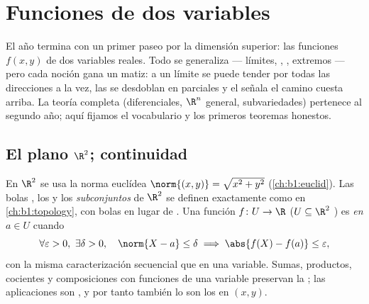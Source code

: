\chapter{Funciones de dos variables}\label{ch:b1:multivar}

El año termina con un primer paseo por la dimensión superior: las funciones
$f(x, y)$ de dos variables reales. Todo se generaliza --- límites,
, , extremos --- pero cada noción gana un matiz:
a un límite se puede tender por todas las direcciones a la vez, las 
se desdoblan en parciales y el  señala el camino cuesta arriba. La
teoría completa (diferenciales, $\R^n$ general, subvariedades) pertenece al
segundo año; aquí fijamos el vocabulario y los primeros teoremas
honestos.

\section{El plano $\R^2$; continuidad}

\begin{definition}\label{def:b1:multivar:topology}
En $\R^2$ se usa la norma euclídea $\norm{(x,y)} = \sqrt{x^2 + y^2}$
(\cref{ch:b1:euclid}). Las bolas , los  y los \emph{subconjuntos
} de $\R^2$ se definen exactamente como en
\cref{ch:b1:topology}, con bolas en lugar de . Una función
$f \colon U \to \R$ ($U \subseteq \R^2$ ) es \emph{
en} $a \in U$ cuando
\[
\forall\varepsilon > 0,\ \exists\delta > 0, \quad
\norm{X - a} \leq \delta \implies \abs{f(X) - f(a)} \leq
\varepsilon,
\]
con la misma caracterización secuencial que en una variable.
Sumas, productos, cocientes y composiciones con funciones 
de una variable preservan la ; las aplicaciones  son
, y por tanto también lo son los  en $(x,y)$.
\end{definition}


